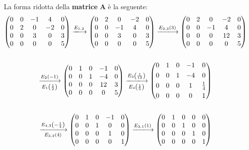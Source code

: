 \documentclass[a4paper]{article}
\makeatletter
\newenvironment{rowequmat}[1]{\left(\array{@{}#1@{}}}{\endarray\right)}
\makeatother
\begin{document}
	\noindent
	La forma ridotta della \textbf{matrice} $\boldsymbol{A}$ è la seguente:
	\begin{gather*}
		\begin{rowequmat}{ccccc}
			0 & 0 & -1 & 4 & 0 \\
			0 & 2 & 0 & -2 & 0 \\
			0 & 0 & 3 & 0 & 3 \\
			0 & 0 & 0 & 0 & 5
		\end{rowequmat} \xlongrightarrow{E_{1,2}}
		\begin{rowequmat}{ccccc}
			0 & 2 & 0 & -2 & 0 \\
			0 & 0 & -1 & 4 & 0 \\
			0 & 0 & 3 & 0 & 3 \\
			0 & 0 & 0 & 0 & 5
		\end{rowequmat} \xlongrightarrow{E_{2,3}\left(3\right)}
		\begin{rowequmat}{ccccc}
			0 & 2 & 0 & -2 & 0 \\
			0 & 0 & -1 & 4 & 0 \\
			0 & 0 & 0 & 12 & 3 \\
			0 & 0 & 0 & 0 & 5
		\end{rowequmat} \\
		\\
		\xlongrightarrow[E_{1}\left(\frac{1}{2}\right)]{E_{2}\left(-1\right)}
		\begin{rowequmat}{ccccc}
			0 & 1 & 0 & -1 & 0 \\
			0 & 0 & 1 & -4 & 0 \\
			0 & 0 & 0 & 12 & 3 \\
			0 & 0 & 0 & 0 & 5
		\end{rowequmat} \xlongrightarrow[E_{4}\left(\frac{1}{5}\right)]{E_{3}\left(\frac{1}{12}\right)}
		\begin{rowequmat}{ccccc}
			0 & 1 & 0 & -1 & 0 \\ [0.3em]
			0 & 0 & 1 & -4 & 0 \\ [0.3em]
			0 & 0 & 0 & 1 & \frac{1}{4} \\ [0.3em]
			0 & 0 & 0 & 0 & 1
		\end{rowequmat} \\
		\\
		\xlongrightarrow[E_{3,2}\left(4\right)]{E_{4,3}\left(-\frac{1}{4}\right)}
		\begin{rowequmat}{ccccc}
			0 & 1 & 0 & -1 & 0 \\
			0 & 0 & 1 & 0 & 0 \\
			0 & 0 & 0 & 1 & 0 \\
			0 & 0 & 0 & 0 & 1
		\end{rowequmat} \xlongrightarrow{E_{3,1}\left(1\right)}
		\begin{rowequmat}{ccccc}
			0 & 1 & 0 & 0 & 0 \\
			0 & 0 & 1 & 0 & 0 \\
			0 & 0 & 0 & 1 & 0 \\
			0 & 0 & 0 & 0 & 1
		\end{rowequmat}
	\end{gather*}
\end{document}
